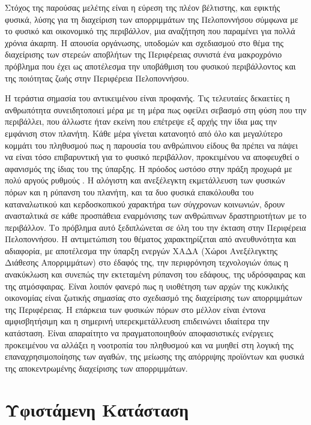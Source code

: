 \documentclass[12pt]{article}
\begin{document}
	Στόχος της παρούσας μελέτης είναι η εύρεση της πλέον βέλτιστης, και εφικτής φυσικά, λύσης για τη διαχείριση των απορριμμάτων της Πελοποννήσου σύμφωνα με το φυσικό και οικονομικό της περιβάλλον, μια αναζήτηση που παραμένει για πολλά χρόνια άκαρπη. Η απουσία οργάνωσης, υποδομών και σχεδιασμού στο θέμα της διαχείρισης των στερεών αποβλήτων της Περιφέρειας συνιστά ένα μακροχρόνιο πρόβλημα που έχει ως αποτέλεσμα την υποβάθμιση του φυσικού περιβάλλοντος και της ποιότητας  ζωής στην Περιφέρεια Πελοποννήσου.
	
	Η τεράστια σημασία του αντικειμένου είναι προφανής. Τις τελευταίες δεκαετίες η ανθρωπότητα συνειδητοποιεί μέρα με τη μέρα πως οφείλει σεβασμό στη φύση που την περιβάλλει, που άλλωστε ήταν εκείνη που επέτρεψε εξ αρχής την ίδια μας την εμφάνιση στον πλανήτη. Κάθε μέρα γίνεται κατανοητό από όλο και μεγαλύτερο κομμάτι του πληθυσμού πως η παρουσία του ανθρώπινου είδους θα πρέπει να πάψει να είναι τόσο επιβαρυντική για το φυσικό περιβάλλον, προκειμένου να αποφευχθεί ο αφανισμός της ίδιας του της ύπαρξης. Η πρόοδος ωστόσο στην πράξη προχωρά με πολύ αργούς ρυθμούς . Η αλόγιστη και ανεξέλεγκτη εκμετάλλευση των φυσικών πόρων και η ρύπανση του πλανήτη, και τα δυο φυσικά επακόλουθα του καταναλωτικού και κερδοσκοπικού χαρακτήρα των σύγχρονων κοινωνιών, δρουν ανασταλτικά σε κάθε προσπάθεια εναρμόνισης των ανθρώπινων δραστηριοτήτων με το περιβάλλον. Το πρόβλημα αυτό ξεδιπλώνεται σε όλη του την έκταση στην Περιφέρεια Πελοποννήσου. Η αντιμετώπιση του θέματος χαρακτηρίζεται από ανευθυνότητα και αδιαφορία, με αποτέλεσμα την ύπαρξη ενεργών ΧΑΔΑ (Χώροι Ανεξέλεγκτης Διάθεσης Απορριμμάτων) στο έδαφός της, την περιφρόνηση τεχνολογιών όπως η ανακύκλωση και συνεπώς την εκτεταμένη ρύπανση του εδάφους, της υδρόσφαιρας και της ατμόσφαιρας. Είναι λοιπόν φανερό πως η υιοθέτηση των αρχών της κυκλικής οικονομίας είναι ζωτικής σημασίας στο σχεδιασμό της διαχείρισης των απορριμμάτων της Περιφέρειας. Η επάρκεια των φυσικών πόρων στο μέλλον είναι έντονα αμφισβητήσιμη και η σημερινή υπερεκμετάλλευση επιδεινώνει ιδιαίτερα την κατάσταση. Είναι απαραίτητο να πραγματοποιηθούν αποφασιστικές ενέργειες προκειμένου να αλλάξει η νοοτροπία του πληθυσμού και να μυηθεί στη λογική της επαναχρησιμοποίησης των αγαθών, της μείωσης της απόρριψης προϊόντων και φυσικά της αποκεντρωμένης διαχείρισης των απορριμμάτων.
	
	\section{Υφιστάμενη Κατάσταση}
	
\end{document}
